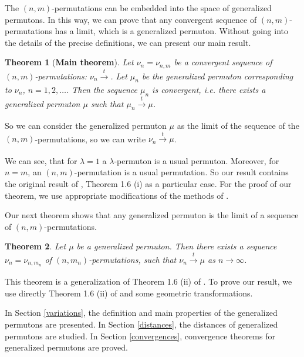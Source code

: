 \documentclass[12pt,twoside]{article}
\theoremstyle{definition}
\theoremstyle{remark}
\numberwithin{equation}{section}
\theoremstyle{plain}
\newtheorem{thm}{Theorem}[section]
\theoremstyle{remark}
\begin{document}
The  $(n,m)$-permutations can be embedded into the space of generalized permutons.
In this way, we can prove that 
any convergent  sequence of $(n,m)$-permutations has a limit, which is a generalized permuton. 
Without going into the details of the precise definitions, we can present our main result.

\begin{thm}[\bf{Main theorem}]  \label{main}
Let $\nu_{n}=\nu_{n,m}$ be a convergent sequence of $(n,m)$-permutations: 
$\nu_{n} \xrightarrow[]{t} $.
Let $\mu_{n}$ be the generalized permuton corresponding to $\nu_{n}$, $n=1,2, \dots$.
Then the sequence $\mu_n$ is convergent, i.e. there exists a generalized permuton 
$\mu$ such that $\mu_{n} \xrightarrow[]{t} \mu$.
\end{thm}

So we can consider the generalized permuton $\mu$ as the limit of the sequence of the $(n,m)$-permutations,
so we can write $\nu_{n} \xrightarrow[]{t} \mu$.

We can see, that for $\lambda=1$ a $\lambda$-permuton is a usual permuton.
Moreover, for $n=m$, an $(n,m)$-permutation is a usual permutation.
So our result contains the original result of \cite{Hoppen}, Theorem 1.6 (i) as a particular case.
For the proof of our theorem, we use appropriate modifications of the methods of \cite{Hoppen}.

Our next theorem shows that any generalized permuton
is the limit of a sequence of $(n,m)$-permutations.

\begin{thm} \label{invMain}
Let $\mu$ be a generalized permuton.
Then there exists a sequence $\nu_{n}=\nu_{n,m_n}$ of $(n,m_n)$-permutations,
such that $\nu_{n} \xrightarrow[]{t} \mu$ as $n\to\infty$.
\end{thm}

This theorem is a generalization of Theorem 1.6 (ii) of \cite{Hoppen}.
To prove our result, we use directly  Theorem 1.6 (ii) of \cite{Hoppen} and some  geometric transformations.


In Section \ref{variations}, the definition and  main properties of the generalized permutons are presented.
In Section \ref{distances}, the distances of generalized permutons are studied.
In Section \ref{convergences}, convergence theorems for generalized permutons are proved.
\end{document}

